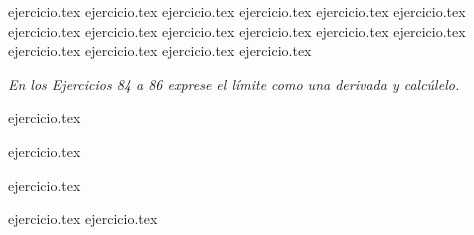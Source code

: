 \begin{enumerate}
    {ejercicio.tex}
    {ejercicio.tex}
    {ejercicio.tex}
    {ejercicio.tex}
    {ejercicio.tex}
    {ejercicio.tex}
    {ejercicio.tex}
    {ejercicio.tex}
    {ejercicio.tex}
    {ejercicio.tex}
    {ejercicio.tex}
    {ejercicio.tex}
    {ejercicio.tex}
    {ejercicio.tex}
    {ejercicio.tex}
    {ejercicio.tex}
\end{enumerate}

\noindent \textit{En los Ejercicios 84 a 86 exprese el límite como una derivada y calcúlelo.}

\begin{enumerate}
    \begin{minipage}{0.45\textwidth}
    \setcounter{enumi}{83}
    {ejercicio.tex}
    \addtocounter{enumi}{1}
    {ejercicio.tex}
    \end{minipage}%
    \begin{minipage}{0.45\textwidth}
    \setcounter{enumi}{84}
    {ejercicio.tex}
    \end{minipage}
\end{enumerate}

\begin{enumerate}
    {ejercicio.tex}
    {ejercicio.tex}
\end{enumerate}
